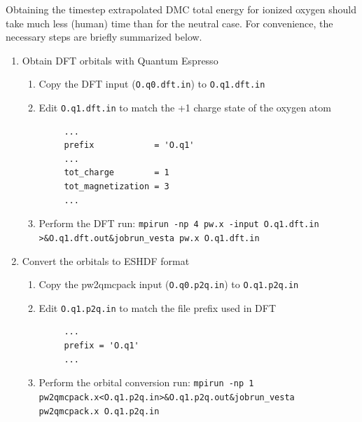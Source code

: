 Obtaining the timestep extrapolated DMC total energy for ionized oxygen should take much less (human) time than for the neutral case.  For convenience, the necessary steps are briefly summarized below.
\begin{enumerate}
  \item{Obtain DFT orbitals with Quantum Espresso}
  \begin{enumerate}
    \item{Copy the DFT input (\texttt{O.q0.dft.in}) to \texttt{O.q1.dft.in}}
    \item{Edit \texttt{O.q1.dft.in} to match the +1 charge state of the oxygen atom}
    \begin{verbatim}
     ...
     prefix            = 'O.q1'
     ...
     tot_charge        = 1
     tot_magnetization = 3
     ...
    \end{verbatim}
    \item{Perform the DFT run: \ifws\verb|mpirun -np 4 pw.x -input O.q1.dft.in >&O.q1.dft.out&|\else\verb|jobrun_vesta pw.x O.q1.dft.in|\fi}
  \end{enumerate}

  \item{Convert the orbitals to ESHDF format}
  \begin{enumerate}
    \item{Copy the pw2qmcpack input (\texttt{O.q0.p2q.in}) to \texttt{O.q1.p2q.in}}
    \item{Edit \texttt{O.q1.p2q.in} to match the file prefix used in DFT}
    \begin{verbatim}
     ...
     prefix = 'O.q1'
     ...
    \end{verbatim}
    \item{Perform the orbital conversion run: \ifws\verb|mpirun -np 1 pw2qmcpack.x<O.q1.p2q.in>&O.q1.p2q.out&|\else\verb|jobrun_vesta pw2qmcpack.x O.q1.p2q.in|\fi}
  \end{enumerate}


\end{enumerate}
